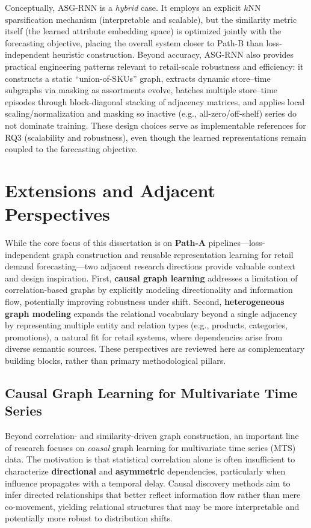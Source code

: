 Conceptually, ASG-RNN is a \emph{hybrid} case. It employs an explicit $k$NN sparsification mechanism (interpretable and scalable), but the similarity metric itself (the learned attribute embedding space) is optimized jointly with the forecasting objective, placing the overall system closer to Path-B than loss-independent heuristic construction. Beyond accuracy, ASG-RNN also provides
practical engineering patterns relevant to retail-scale robustness and efficiency: it constructs a static ``union-of-SKUs'' graph, extracts dynamic store--time subgraphs via masking as assortments evolve, batches multiple store--time episodes through block-diagonal stacking of adjacency matrices, and applies local scaling/normalization and masking so inactive (e.g., all-zero/off-shelf) series do
not dominate training. These design choices serve as implementable references for RQ3 (scalability and robustness), even though the learned representations remain coupled to the forecasting objective.



\section{Extensions and Adjacent Perspectives}
\label{sec:extensions-adjacent}

While the core focus of this dissertation is on \textbf{Path-A} pipelines---loss-independent graph construction and
reusable representation learning for retail demand forecasting---two adjacent research directions provide valuable
context and design inspiration. First, \textbf{causal graph learning} addresses a limitation of correlation-based
graphs by explicitly modeling directionality and information flow, potentially improving robustness under shift.
Second, \textbf{heterogeneous graph modeling} expands the relational vocabulary beyond a single adjacency by
representing multiple entity and relation types (e.g., products, categories, promotions), a natural fit for retail
systems, where dependencies arise from diverse semantic sources. These perspectives are reviewed here as complementary
building blocks, rather than primary methodological pillars.

\subsection{Causal Graph Learning for Multivariate Time Series}
\label{sec:causal-graph-mts}

Beyond correlation- and similarity-driven graph construction, an important line of research focuses on \emph{causal}
graph learning for multivariate time series (MTS) data. The motivation is that statistical correlation alone is often
insufficient to characterize \textbf{directional} and \textbf{asymmetric} dependencies, particularly when influence
propagates with a temporal delay. Causal discovery methods aim to infer directed relationships that better reflect
information flow rather than mere co-movement, yielding relational structures that may be more interpretable and
potentially more robust to distribution shifts.

